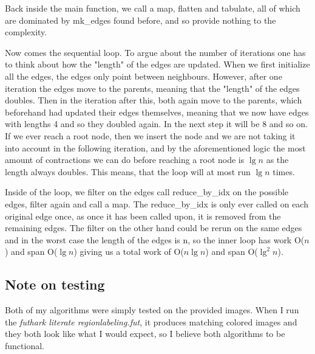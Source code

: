 Back inside the main function, we call a map, flatten and tabulate, all of
which are dominated by mk\_edges found before, and so provide nothing to the
complexity. 

Now comes the sequential loop. To argue about the number of iterations one has
to think about how the "length" of the edges are updated. When we first
initialize all the edges, the edges only point between neighbours. However,
after one iteration the edges move to the parents, meaning that the "length" of
the edges doubles. Then in the iteration after this, both again move to the
parents, which beforehand had updated their edges themselves, meaning that we
now have edges with lengths 4 and so they doubled again. In the next step it
will be 8 and so on. If we ever reach a root node, then we insert the node and
we are not taking it into account in the following iteration, and by the
aforementioned logic the most amount of contractions we can do before reaching
a root node is $\lg n$ as the length always doubles. This means, that the loop
will at most run $\lg n$ times.

Inside of the loop, we filter on the edges call reduce\_by\_idx on the possible
edges, filter again and call a map. The reduce\_by\_idx is only ever called on
each original edge once, as once it has been called upon, it is removed from
the remaining edges. The filter on the other hand could be rerun on the same
edges and in the worst case the length of the edges is n, so the inner loop has
work O($n$) and span O($\lg n$) giving us a total work of O($n \lg n$) and span
O($\lg^2 n$).

\subsection*{Note on testing}
Both of my algorithms were simply tested on the provided images. When I run the
\emph{futhark literate regionlabeling.fut}, it produces matching colored images
and they both look like what I would expect, so I believe both algorithms to be
functional.
